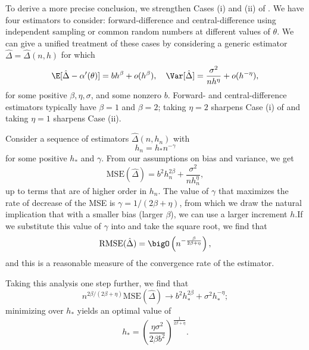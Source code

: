 To derive a more precise conclusion, we strengthen Cases (i) and (ii) of . We have four estimators to consider: forward-difference and central-difference using independent sampling or common random numbers at different values of $\theta$. We can give a unified treatment of these cases by considering a generic estimator $\hat{\Delta} = \hat{\Delta}(n, h)$ for which
\begin{equation}
	\label{eq:BiasVarianceTradeoff}
	\E[\hat{\Delta} - \alpha'(\theta)] = b h^\beta + o(h^\beta), \quad \Var[\hat{\Delta}] = \frac{\sigma^2}{n h^\eta} + o(h^{-\eta}),
\end{equation}
for some positive $\beta, \eta, \sigma$, and some nonzero $b$. Forward- and central-difference estimators typically have $\beta = 1$ and $\beta = 2$; taking $\eta = 2$ sharpens Case (i) of  and taking $\eta = 1$ sharpens Case (ii).

Consider a sequence of estimators $\hat{\Delta}(n, h_n)$ with
\begin{equation}
	\label{eq:BandwidthSequence}
	h_n = h_* n^{-\gamma}
\end{equation}
for some positive $h_*$ and $\gamma$. From our assumptions on bias and variance, we get
\begin{equation}
	\label{eq:MSEExpansion}
	\mathrm{MSE}(\hat{\Delta}) = b^2 h_n^{2\beta} + \frac{\sigma^2}{n h_n^\eta},
\end{equation}
up to terms that are of higher order in $h_n$. The value of $\gamma$ that maximizes the rate of decrease of the MSE is $\gamma = 1/(2\beta + \eta)$, from which we draw the natural implication that with a smaller bias (larger \(\beta\)), we can use a larger increment \(h\).If we substitute this value of $\gamma$ into  and take the square
root, we find that
\begin{equation} \label{RmseConvergence}
	\mathrm{RMSE}(\hat{\Delta}) = \bigO \left( n^{-\frac{\beta}{2\beta+\eta}} \right) ,
\end{equation}
and this is a reasonable measure of the convergence rate of the estimator.

Taking this analysis one step further, we find that
\begin{equation} \label{MseLimit}
	n^{2\beta/(2\beta+\eta)}\mathrm{MSE}(\hat{\Delta}) \to b^2 h_*^{2\beta} + \sigma^2 h_*^{-\eta};
\end{equation}
minimizing over $h_*$ yields an optimal value of
\begin{equation} \label{OptimalHStar}
	h_* = \left( \frac{\eta\sigma^2}{2\beta b^2} \right)^{\frac{1}{2\beta+\eta}} .
\end{equation}


